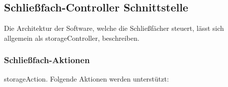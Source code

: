 \newpage
\subsection{Schließfach-Controller Schnittstelle}\label{sec:impl:storagecontroller}
Die Architektur der Software, welche die Schließfächer steuert, lässt sich allgemein als \glsdesc{storageController}, beschreiben. 

\subsubsection{Schließfach-Aktionen}\label{sec:impl:storageController:actions}
\glsdesc{storageAction}. Folgende Aktionen werden unterstützt:
